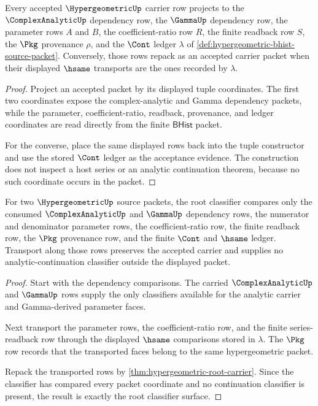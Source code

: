 \begin{theorem}
\label{thm:hypergeometric-root-carrier}
Every accepted $\HypergeometricUp$ carrier row projects to the
$\ComplexAnalyticUp$ dependency row, the $\GammaUp$ dependency row, the
parameter rows $A$ and $B$, the coefficient-ratio row $R$, the finite readback
row $S$, the $\Pkg$ provenance $\rho$, and the $\Cont$ ledger $\lambda$ of
\autoref{def:hypergeometric-bhist-source-packet}. Conversely, those rows repack
as an accepted carrier packet when their displayed $\hsame$ transports are the
ones recorded by $\lambda$.
\end{theorem}
\begin{proof}
Project an accepted packet by its displayed tuple coordinates. The first two
coordinates expose the complex-analytic and Gamma dependency packets, while the
parameter, coefficient-ratio, readback, provenance, and ledger coordinates are
read directly from the finite $\mathsf{BHist}$ packet.

For the converse, place the same displayed rows back into the tuple constructor
and use the stored $\Cont$ ledger as the acceptance evidence. The construction
does not inspect a host series or an analytic continuation theorem, because no
such coordinate occurs in the packet.
\end{proof}

\begin{theorem}
\label{thm:hypergeometric-root-classifier}
For two $\HypergeometricUp$ source packets, the root classifier compares only
the consumed $\ComplexAnalyticUp$ and $\GammaUp$ dependency rows, the numerator
and denominator parameter rows, the coefficient-ratio row, the finite readback
row, the $\Pkg$ provenance row, and the finite $\Cont$ and $\hsame$ ledger.
Transport along those rows preserves the accepted carrier and supplies no
analytic-continuation classifier outside the displayed packet.
\end{theorem}
\begin{proof}
Start with the dependency comparisons. The carried
$\ComplexAnalyticUp$ and $\GammaUp$ rows supply the only classifiers available
for the analytic carrier and Gamma-derived parameter faces.

Next transport the parameter rows, the coefficient-ratio row, and the finite
series-readback row through the displayed $\hsame$ comparisons stored in
$\lambda$. The $\Pkg$ row records that the transported faces belong to the same
hypergeometric packet.

Repack the transported rows by
\autoref{thm:hypergeometric-root-carrier}. Since the classifier has compared
every packet coordinate and no continuation classifier is present, the result is
exactly the root classifier surface.
\end{proof}

